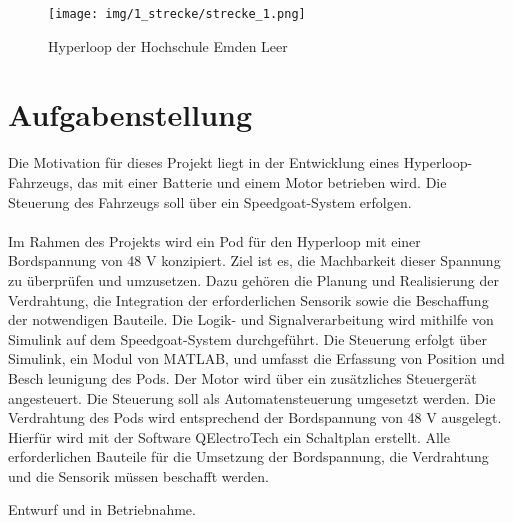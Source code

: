 \begin{figure}[ht]
	\begin{center}
		\texttt{[image: img/1\_strecke/strecke\_1.png]}
		\caption{Hyperloop der Hochschule Emden Leer}
		\label{img_1_1:strecke}
	\end{center}
\end{figure}
\newpage



\section{Aufgabenstellung}


Die Motivation für dieses Projekt liegt in der Entwicklung eines Hyperloop-Fahrzeugs, das mit einer Batterie und einem Motor betrieben wird. Die Steuerung des Fahrzeugs soll über ein Speedgoat-System erfolgen.\\ \ \\
Im Rahmen des Projekts wird ein Pod für den Hyperloop mit einer Bordspannung von 48 V konzipiert. Ziel ist es, die Machbarkeit dieser Spannung zu überprüfen und umzusetzen. Dazu gehören die Planung und Realisierung der Verdrahtung, die Integration der erforderlichen Sensorik sowie die Beschaffung der notwendigen Bauteile. Die Logik- und Signalverarbeitung wird mithilfe von Simulink auf dem Speedgoat-System durchgeführt.
Die Steuerung erfolgt über Simulink, ein Modul von MATLAB, und umfasst die Erfassung von Position und Besch leunigung des Pods. Der Motor wird über ein zusätzliches Steuergerät angesteuert. Die Steuerung soll als Automatensteuerung umgesetzt werden.
Die Verdrahtung des Pods wird entsprechend der Bordspannung von 48 V ausgelegt. Hierfür wird mit der Software QElectroTech ein Schaltplan erstellt.
Alle erforderlichen Bauteile für die Umsetzung der Bordspannung, die Verdrahtung und die Sensorik müssen beschafft werden.


Entwurf und in Betriebnahme.


\pagebreak

